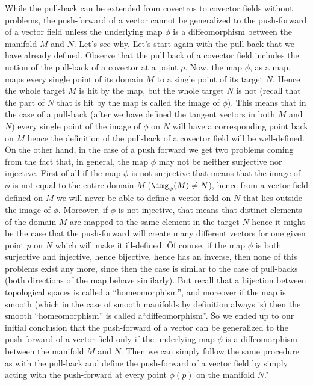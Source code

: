 While the pull-back can be extended from covectros to covector fields without problems, the push-forward of a vector
cannot be generalized to the push-forward of a vector field unless the underlying map $\phi$ is a diffeomorphism
between the manifold $M$ and $N$. Let's see why. \v

Let's start again with the pull-back that we have already defined. Observe that the pull back of a covector field
includes the notion of the pull-back of a covector at a point $p$. Now, the map $\phi$, as a map, maps every single
point of its domain $M$ to a single point of its target $N$. Hence the whole target $M$ is hit by the map, but the
whole target $N$ is not (recall that the part of $N$ that is hit by the map is called the image of $\phi$). This
means that in the case of a pull-back (after we have defined the tangent vectors in both $M$ and $N$) every single
point of the image of $\phi$ on $N$ will have a corresponding point back on $M$ hence the definition of the pull-back
of a covector field will be well-defined. \v

On the other hand, in the case of a push forward we get two problems coming from the fact that, in general, the map
$\phi$ may not be neither surjective nor injective. First of all if the map $\phi$ is not surjective that means that
the image of $\phi$ is not equal to the entire domain $M$ ($\img_\phi(M) \neq N$), hence from a vector field defined
on $M$ we will never be able to define a vector field on $N$ that lies outside the image of $\phi$. Moreover, if
$\phi$ is not injective, that means that distinct elements of the domain $M$ are mapped to the same element in the
target $N$ hence it might be the case that the push-forward will create many different vectors for one given point
$p$ on $N$ which will make it ill-defined. \v

Of course, if the map $\phi$ is both surjective and injective, hence bijective, hence has an inverse, then none of
this problems exist any more, since then the case is similar to the case of pull-backs (both directions of the map
behave similarly). But recall that a bijection between topological spaces is called a ``homeomorphism'', and moreover
if the map is smooth (which in the case of smooth manifolds by definition always is) then the smooth ``homeomorphism''
is called a``diffeomorphism''. \v

So we ended up to our initial conclusion that the push-forward of a vector can be generalized to the push-forward of
a vector field only if the underlying map $\phi$ is a diffeomorphism between the manifold $M$ and $N$. Then we can
simply follow the same procedure as with the pull-back and define the push-forward of a vector field by simply acting
with the push-forward at every point $\phi(p)$ on the manifold $N$. \v

